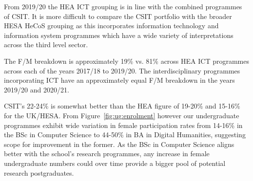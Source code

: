 
From 2019/20 the HEA ICT grouping is in line with the combined programmes of CSIT. It is more difficult to compare the CSIT portfolio with the broader HESA HeCoS grouping as this incorporates information technology and information system programmes which have a wide variety of interpretations across the third level sector.

The F/M breakdown is approximately 19\% vs. 81\% across HEA ICT programmes 
across each of the years 2017/18 to 2019/20. The interdisciplinary programmes 
incorporating ICT have an approximately equal F/M breakdown in the years 2019/20 
and 2020/21.




CSIT's 22-24\% 
is somewhat better than the HEA figure of 19-20\% and 15-16\% for the 
UK/HESA. From Figure~\ref{fig:ug:enrolment} however
our undergraduate programmes exhibit wide variation in
female participation rates from 14-16\% in the BSc in Computer Science
to 44-50\% in BA in Digital Humanities, suggesting scope for improvement
in the former. As the  BSc in Computer Science aligns better
with the school's research programmes, any increase in female 
undergraduate numbers could over time provide a bigger pool 
of potential research postgraduates.



